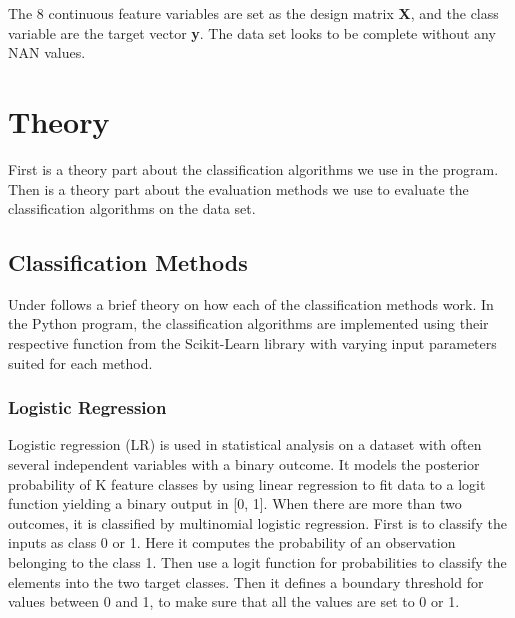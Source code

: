 \documentclass[12pt,a4paper,english]{article}
\begin{document}
The 8 continuous feature variables are set as the design matrix \textbf{X}, and the class variable are the target vector \textbf{y}. The data set looks to be complete without any NAN values.

\section{Theory}
\label{sect:Theory}
First is a theory part about the classification algorithms we use in the program. Then is a theory part about the evaluation methods we use to evaluate the classification algorithms on the data set.

\subsection{Classification Methods}
\label{subsect:class_methods}
Under follows a brief theory on how each of the classification methods work. In the Python program, the classification algorithms are implemented using their respective function from the Scikit-Learn library with varying input parameters suited for each method.

\subsubsection{Logistic Regression}
\label{subsubsect:LR}
Logistic regression (LR) is used in statistical analysis on a dataset with often several independent variables with a binary outcome. It models the posterior probability of K feature classes by using linear regression to fit data to a logit function yielding a binary output in [0, 1]. When there are more than two outcomes, it is classified by multinomial logistic regression. First is to classify the inputs as class 0 or 1. Here it computes the probability of an observation belonging to the class 1. Then use a logit function for probabilities to classify the elements into the two target classes. Then it defines a boundary threshold for values between 0 and 1, to make sure that all the values are set to 0 or 1. \cite{LR}
\end{document}
